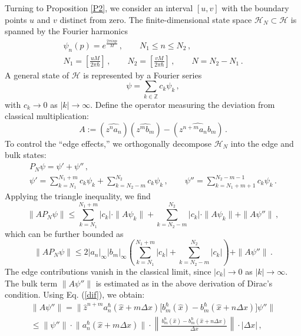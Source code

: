 \documentclass[12pt,a4paper]{article}
\numberwithin{equation}{section}
\theoremstyle{theorem}
\theoremstyle{remark}
\newcommand{\hh}{\mathcal{H}}
\begin{document}
Turning to Proposition \ref{P2}, we consider an interval $[u,v]$ with the boundary points $u$ and $v$ distinct from zero. 
The finite-dimensional state space $\hh_N\subset \hh$ is spanned by the Fourier harmonics 
\begin{equation}
\begin{array}{c}
\psi_n(p)=e^{\frac{2\pi inp}{M}}\,,\qquad N_1\leq n\leq N_2\,,\\[5mm]
\displaystyle N_1=\left[\frac{uM}{2\pi \hbar }\right]\,,\qquad N_2=\left[\frac{vM}{2\pi \hbar }\right] \,, \qquad N=N_2-N_1\,.
\end{array}
\end{equation}
A general state of $\hh$ is represented by a  Fourier series 
\begin{equation}
    \psi=\sum_{k\in \mathbb{Z}}c_k \psi_k\,,
\end{equation}
with $c_k\to 0 $ as $|k|\to \infty$. Define the operator measuring the deviation from classical multiplication:
$$
A:=(\widehat{z^na_n} ) (\widehat{z^mb_m})- (\widehat{z^{n+m}a_nb_m})\,.
$$
To control the “edge effects,” we orthogonally decompose $\hh_N$ into the edge and bulk states:
\begin{equation}\label{od}
\begin{array}{c}
    P_N\psi=\psi'+\psi''\,,\\[5mm]
    \displaystyle \psi'=\sum_{k=N_1}^{N_1+m} c_k\psi_k+\sum_{k=N_2-m}^{N_2} c_k \psi_k  \,,\qquad 
    \psi''=  \sum_{k=N_1+m+1}^{N_2-m-1}   c_k\psi_k \,.  
    \end{array}
     \end{equation}
Applying the triangle inequality, we find
\begin{equation}
 \|A P_N\psi\big\|  \leq\sum_{k=N_1}^{N_1+m}   |c_k|\cdot \|A\psi_k\big\|
    + \sum_{k=N_2-m}^{N_2}   |c_k|\cdot  \|A\psi_k\big\|  
     +     \|A\psi''\big\|     \,,
     \end{equation}
which can be further bounded as
     \begin{equation}
\|A P_N\psi\big\|\leq 2|a_n|_\infty |b_m|_\infty\left(\sum_{k=N_1}^{N_1+m}   |c_k|+\sum_{k=N_2-m}^{N_2} |c_k|\right)    +
     \|A \psi''\big\|  \,.
     \end{equation}
The edge contributions  vanish  in the classical limit, since $|c_k|\rightarrow 0$ as $|k|\rightarrow \infty$. The bulk term $\|A\psi''\|$
is estimated as in the above derivation of Dirac’s condition. Using Eq. (\ref{dif}), we obtain:
\begin{equation}
\begin{array}{c}
    \|A\psi''\|=\big\|\hat z^{n+m}a^\hbar_n(\hat x+m\Delta x) \big[b_m^\hbar(\hat x)-b_m^\hbar(\hat x+n\Delta x) \big ]\psi''\big\| \\[5mm]
   \displaystyle \leq \|\psi''\|\cdot \big\|a^\hbar_n(\hat x+m\Delta x)\big\|\cdot    \left\|\frac {b_m^\hbar(\hat x)-b_m^\hbar(\hat x+n\Delta x)}{\Delta x} \right\|  \cdot |\Delta x|  \,,\end{array}
    \end{equation}
\end{document}
